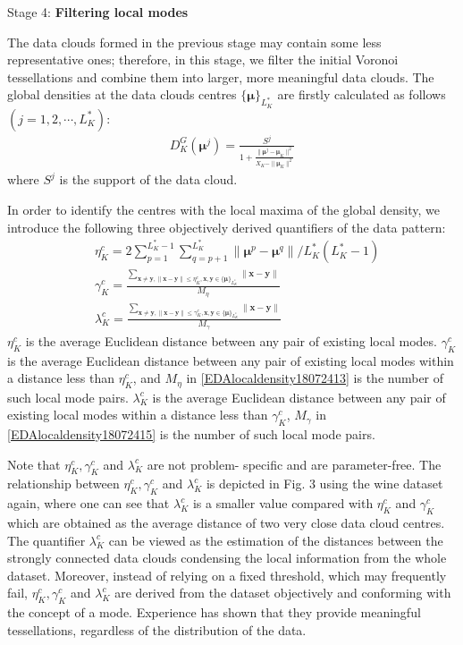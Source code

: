 {Stage 4: \textbf{Filtering local modes}

The data clouds formed in the previous stage may contain some less representative ones; therefore, in this stage, we filter the initial Voronoi tessellations and combine them into larger, more meaningful data clouds.
The global densities at the data clouds centres $\{\bm\mu\}_{L_K^*}$ are firstly calculated as follows $( j = 1, 2, \cdots, L_K^*)$:
\begin{align}\label{EDAlocaldensity18072412}
 D^G_K(\bm\mu^j ) = \frac{S^j}{1 +\frac{\|\bm\mu^j-\bm\mu_K\|^2}{X_K-\|\bm \mu_K\|^2} }
\end{align}
where $S^j$ is the support of the data cloud.

In order to identify the centres with the local maxima of the global density, we introduce the following three objectively derived quantifiers of the data pattern:
\begin{align}
&\eta_K^c = 2\sum^{L^*_K-1}_{ p=1}\sum^{L^*_K}_{q=p+1} \|\bm \mu^p - \bm \mu^q\|  /L^*_K({L^*_K-1})\label{EDAlocaldensity18072413}\\
&\gamma_K^c =\frac{\sum\limits_{\bm x\neq \bm y, \|\bm x-\bm y\|\leq \eta_K^c,\bm x,\bm y\in \{\bm\mu\}_{L_K^*}}\|\bm x-\bm y\|}{M_\eta}\label{EDAlocaldensity18072414}\\
&\lambda_K^c =\frac{\sum\limits_{\bm x\neq \bm y, \|\bm x-\bm y\|\leq \gamma_K^c,\bm x,\bm y\in \{\bm\mu\}_{L_K^*}}\|\bm x-\bm y\|}{M_\gamma}\label{EDAlocaldensity18072415}
\end{align}
$\eta_K^c$ is the average Euclidean distance between any pair of existing local modes. $\gamma_K^c$ is the average Euclidean distance between any pair of existing local modes within a distance less than $\eta_K^c$, and $M_\eta$ in \eqref{EDAlocaldensity18072413} is the number of such local mode pairs. $\lambda_K^c$ is the average Euclidean distance between any pair of existing local modes within a distance less than $\gamma_K^c$, $M_\gamma$ in \eqref{EDAlocaldensity18072415} is the number of such local mode pairs.

Note that $\eta_K^c, \gamma_K^c$ and $\lambda_K^c$ are not problem- specific and are parameter-free. The relationship between $\eta_K^c, \gamma_K^c$ and $\lambda_K^c$ is depicted in Fig. 3 using the wine dataset \cite{AeberhardWinedata1992} again, where one can see that $\lambda_K^c$ is a smaller value compared with $\eta_K^c$ and $\gamma_K^c$ which are obtained as the average distance of two very close data cloud centres.
The quantifier $\lambda_K^c$ can be viewed as the estimation of the distances between the strongly connected data clouds condensing the local information from the whole dataset. Moreover, instead of relying on a fixed threshold, which may frequently fail, $\eta_K^c, \gamma_K^c$ and $\lambda_K^c$ are derived from the dataset objectively and conforming with the concept of a mode. Experience has shown that they provide meaningful tessellations, regardless of the distribution of the data.

}
